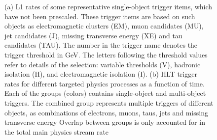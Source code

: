 \begin{figure}[htb]
  \caption[L1 and HLT trigger rates]
          {(a) L1 rates of some representative single-object trigger items, which have not been prescaled.
          These trigger items are based on such objects as electromagnetic clusters (EM), muon candidates (MU), jet candidates (J), missing transverse energy (XE) and tau candidates (TAU).
          The number in the trigger name denotes the trigger threshold in GeV.
          The letters following the threshold values refer to details of the selection: variable thresholds (V), hadronic isolation (H), and electromagnetic isolation (I). 
          (b) HLT trigger rates for different targeted physics processes as a function of time.
          Each of the groups (colors) contains single-object and multi-object triggers.
          The combined group represents multiple triggers of different objects, as combinations of electrons, muons, taus, jets and missing transverse energy
          Overlap between groups is only accounted for in the total main physics stream rate ~\cite{Triggerrates}}
      \label{fig:detector:triggerrates}
\end{figure}
